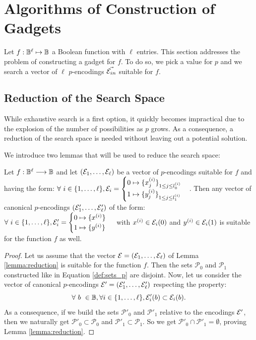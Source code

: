 \section{Algorithms of Construction of Gadgets}
\label{sec:p_encodings_search}

Let $f: \mathbb{B}^\ell \mapsto \mathbb{B}$ a Boolean function with $\ell$ entries. This section addresses the problem of constructing a gadget for $f$. To do so, we pick a value for $p$ and we search a vector of $\ell$ $p$-encodings $\Vec{\mathcal{E}_{in}}$ suitable for $f$. 

\subsection{Reduction of the Search Space}
\label{sec:restriction}

While exhaustive search is a first option, it quickly becomes impractical due to the explosion of the number of possibilities as $p$ grows. As a consequence, a reduction of the search space is needed without leaving out a potential solution.

We introduce two lemmas that will be used to reduce the search space:

\begin{lemma} 
    Let $f: \mathbb{B}^\ell \longrightarrow \mathbb{B}$ and let $(\mathcal{E}_1, \dots, \mathcal{E}_\ell)$ be a vector of $p$-encodings suitable for $f$ and having the form:
    $\forall~i \in \{1, \dots, \ell\}, \mathcal{E}_i = \begin{cases} 0 \mapsto \{x_j^{(i)}\}_{1 \le j \le l_0^{(i)}} \\ 1 \mapsto \{y_j^{(i)}\}_{1 \le j \le l_1^{(i)}} \end{cases}$.
    Then any vector of canonical $p$-encodings $(\mathcal{E}'_1, \dots, \mathcal{E}'_\ell)$ of the form: $ \forall~i \in \{1, \dots, \ell\}, \mathcal{E}'_i = \begin{cases} 0 \mapsto \{x^{(i)}\} \\ 1 \mapsto \{y^{(i)}\} \end{cases}$ with $x^{(i)} \in \mathcal{E}_i(0)$ and $ y^{(i)} \in \mathcal{E}_i(1)$ is suitable for the function $f$ as well.
    \label{lemma:reduction}
\end{lemma}


\begin{proof}
Let us assume that the vector $\mathcal{E} = (\mathcal{E}_1, \dots, \mathcal{E}_\ell)$ of Lemma \ref{lemma:reduction} is suitable for the function $f$. Then the sets $\mathcal{P}_0$ and $\mathcal{P}_1$ constructed like in Equation \ref{def:sets_p} are disjoint.
Now, let us consider the vector of canonical $p$-encodings $\mathcal{E}' = (\mathcal{E}'_1, \dots, \mathcal{E}'_\ell)$ respecting the property:
$$
\forall~b \ \in \mathbb{B}, \forall i \in \{1, \dots, \ell\}, \mathcal{E}'_i(b) \subset \mathcal{E}_i(b).
$$
As a consequence, if we build the sets $\mathcal{P'}_0$ and $\mathcal{P'}_1$ relative to the encodings $\mathcal{E}'$, then we naturally get $\mathcal{P'}_0 \subset \mathcal{P}_0$ and $\mathcal{P'}_1 \subset \mathcal{P}_1$. So we get $\mathcal{P'}_0 \cap \mathcal{P'}_1 = \emptyset$, proving Lemma \ref{lemma:reduction}.
\end{proof}


